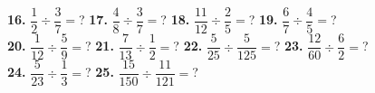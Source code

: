 \documentclass[a4paper]{article}
\begin{document}
\begin{Large}
\textbf{16.} $\dfrac{1}{2} \div \dfrac{3}{7} =$? \hspace{0.2cm}
\textbf{17.} $\dfrac{4}{8} \div \dfrac{3}{7} =$? \hspace{0.2cm}
\textbf{18.} $\dfrac{11}{12} \div \dfrac{2}{5} =$? \hspace{0.2cm}
\textbf{19.} $\dfrac{6}{7} \div \dfrac{4}{5} =$?  \\[0.75cm]
\textbf{20.} $\dfrac{1}{12} \div \dfrac{5}{9} =$? \hspace{0.2cm}
\textbf{21.} $\dfrac{7}{13} \div \dfrac{1}{2} =$? \hspace{0.2cm}
\textbf{22.} $\dfrac{5}{25} \div \dfrac{5}{125} =$? \hspace{0.2cm}
\textbf{23.} $\dfrac{12}{60} \div \dfrac{6}{2} =$?  \\[0.75cm]
\textbf{24.} $\dfrac{5}{23} \div \dfrac{1}{3} =$? \hspace{0.2cm}
\textbf{25.} $\dfrac{15}{150} \div \dfrac{11}{121} =$? \hspace{0.2cm}

\end{Large}
\end{document}
